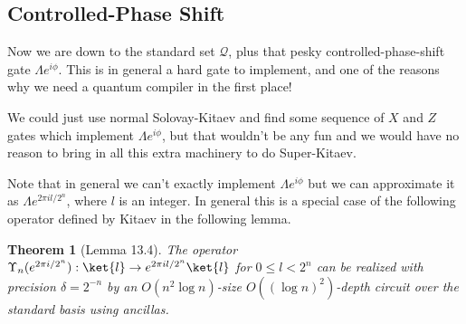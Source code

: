 \documentclass{article}
\theoremstyle{plain}
\newtheorem{theorem}{Theorem}
\begin{document}
\subsection{Controlled-Phase Shift}
\label{subsec:phase-shift}

Now we are down to the standard set $\mathcal{Q}$, plus that pesky
controlled-phase-shift gate $\Lambda{e^{i\phi}}$. This is in general a hard
gate to implement, and one of the reasons why we need a quantum compiler in
the first place!

We could just use normal Solovay-Kitaev and find some sequence of $X$ and
$Z$ gates which implement $\Lambda{e^{i\phi}}$, but that wouldn't be any
fun and we would have no reason to bring in all this extra machinery to
do Super-Kitaev.

Note that in general we can't exactly implement $\Lambda{e^{i\phi}}$ but we
can approximate it as $\Lambda{e^{2\pi i l / 2^n}}$, where $l$ is an integer.
In general this is a special case of the following operator
defined by Kitaev in the following lemma.

\begin{theorem}[Lemma 13.4]
The operator 
$\Upsilon_n(e^{2\pi i / 2^n}) : \ket{l} \rightarrow e^{2\pi i l / 2^n} \ket{l}$
for $0 \le l < 2^n$ can be realized with precision $\delta = 2^{-n}$ by an
$O(n^2 \log n)$-size $O((\log n)^2)$-depth circuit over the standard basis
using ancillas.
\end{theorem}
\end{document}
